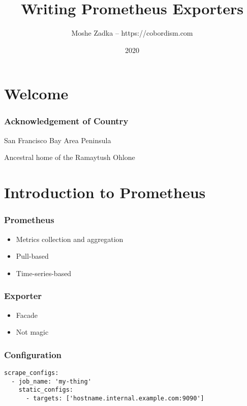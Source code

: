 \usepackage{hyperref}
\usepackage{graphicx}
\usepackage{listings}
\usepackage{textcomp}
\usepackage{fancyvrb}

\title{Writing Prometheus Exporters}
\author{Moshe Zadka -- https://cobordism.com}
\date{2020}


\begin{titlepage}
\maketitle
\end{titlepage}

\section{Welcome}

\frame{\titlepage}

\begin{frame}
\frametitle{Acknowledgement of Country}

San Francisco Bay Area Peninsula

Ancestral home of the Ramaytush Ohlone

\end{frame}

\section{Introduction to Prometheus}

\begin{frame}
\frametitle{Prometheus}

\begin{itemize}
\item Metrics collection and aggregation
\item Pull-based
\item Time-series-based
\end{itemize}

\end{frame}

\begin{frame}
\frametitle{Exporter}

\begin{itemize}
\item Facade
\item Not magic
\end{itemize}

\end{frame}

\begin{frame}[fragile]
\frametitle{Configuration}

\begin{lstlisting}
scrape_configs:
  - job_name: 'my-thing'
    static_configs:
      - targets: ['hostname.internal.example.com:9090']
\end{lstlisting}

\end{frame}

